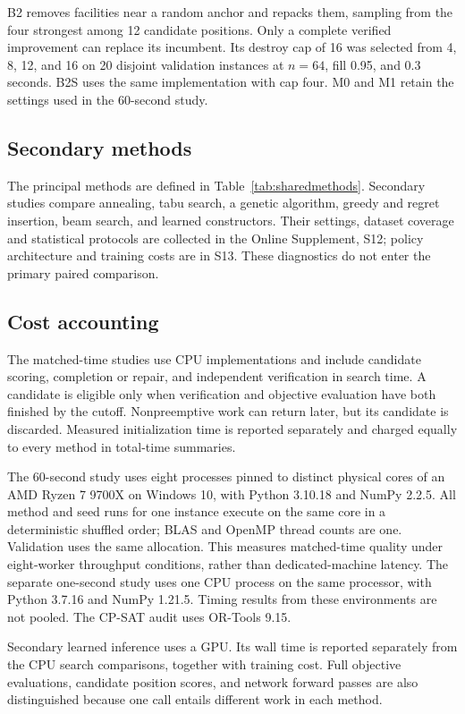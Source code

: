\documentclass[preprint,12pt,authoryear,nonatbib]{elsarticle}
\begin{document}
B2 removes facilities near a random anchor and repacks them, sampling from
the four strongest among 12 candidate positions. Only a complete verified
improvement can replace its incumbent. Its destroy cap of 16 was selected
from 4, 8, 12, and 16 on 20 disjoint validation instances at $n=64$, fill
0.95, and 0.3 seconds. B2S uses the same implementation with cap four.
M0 and M1 retain the settings used in the 60-second study.

\subsection{Secondary methods}
The principal methods are defined in Table~\ref{tab:sharedmethods}. Secondary
studies compare annealing, tabu search, a genetic algorithm, greedy and regret
insertion, beam search, and learned constructors. Their settings, dataset
coverage and statistical protocols are collected in the Online Supplement,
S12; policy architecture and training costs are in S13. These diagnostics do
not enter the primary paired comparison.

\subsection{Cost accounting}
\label{sec:cost}
The matched-time studies use CPU implementations and include candidate
scoring, completion or repair, and independent verification in search time.
A candidate is eligible only when verification and objective evaluation have
both finished by the cutoff. Nonpreemptive work can return later, but its
candidate is discarded. Measured initialization time is reported separately
and charged equally to every method in total-time summaries.

The 60-second study uses eight processes pinned to distinct physical cores
of an AMD Ryzen 7 9700X on Windows 10, with Python 3.10.18 and NumPy 2.2.5.
All method and seed runs for one instance execute on the same core in a
deterministic shuffled order; BLAS and OpenMP thread counts are one.
Validation uses the same allocation. This measures matched-time quality under
eight-worker throughput conditions, rather than dedicated-machine latency.
The separate one-second study uses one CPU process on the same processor,
with Python 3.7.16 and NumPy 1.21.5. Timing results from these environments
are not pooled. The CP-SAT audit uses OR-Tools 9.15.

Secondary learned inference uses a GPU. Its wall time is reported separately
from the CPU search comparisons, together with training cost. Full objective
evaluations, candidate position scores, and network forward passes are also
distinguished because one call entails different work in each method.
\end{document}
